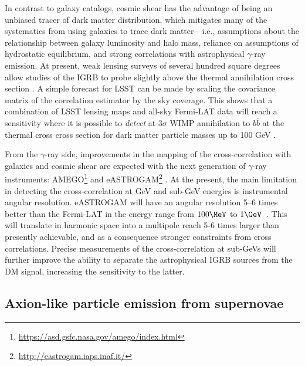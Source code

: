 In contrast to galaxy catalogs, cosmic shear has the advantage of being an unbiased tracer of dark matter distribution, which mitigates many of the systematics from using galaxies to trace dark matter---i.e., assumptions about the relationship between galaxy luminosity and halo mass, reliance on assumptions of hydrostatic equilibrium, and strong correlations with astrophysical $\gamma$-ray emission. At present, weak lensing surveys of several hundred square degrees allow studies of the IGRB to probe slightly above the thermal annihilation cross section \citep{1404.5503,1607.02187,1611.03554}. A simple forecast for LSST can be made by scaling the covariance matrix of the correlation estimator by the sky coverage. This shows that a combination of LSST lensing maps and all-sky Fermi-LAT data will reach a sensitivity where it is possible to \textit{detect} at $3\sigma$ WIMP annihilation to $b\bar{b}$ at the thermal cross cross section for dark matter particle masses up to 100 GeV \citep{1404.5503}.   


From the $\gamma$-ray side, improvements in the mapping of the cross-correlation with galaxies and cosmic shear are expected with the next generation of $\gamma$-ray instruments: AMEGO\footnote{\url{https://asd.gsfc.nasa.gov/amego/index.html}} and eASTROGAM\footnote{\url{http://eastrogam.iaps.inaf.it/}} \citep{1711.01265}.
At the present, the main limitation in detecting the cross-correlation at GeV and sub-GeV energies is instrumental angular resolution.  
eASTROGAM will have an angular resolution 5--6 times better than the Fermi-LAT in the energy range from $100 \MeV$ to $1 \GeV$~\citep{1711.01265}. This will translate in harmonic space into a multipole reach 5-6 times larger than presently achievable, and as a consequence stronger constraints from cross correlations.
Precise measurements of the cross-correlation at sub-GeVs will further improve the ability to separate the astrophysical IGRB sources from the DM signal, increasing the sensitivity to the latter. 

\subsection{Axion-like particle emission from supernovae }
\label{sec:alp_id}

